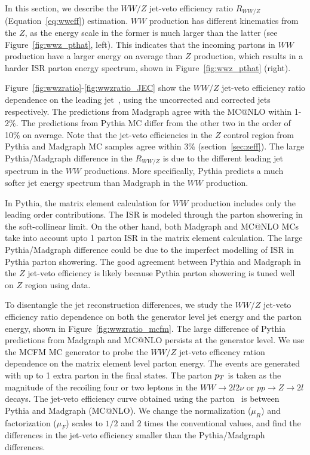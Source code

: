 In this section, we describe the $WW/Z$ jet-veto efficiency 
ratio $R_{WW/Z}$ (Equation~\ref{eq:wweff}) estimation. 
$WW$ production has different kinematics from the $Z$, as 
the energy scale in the former is much larger than the latter 
(see Figure~\ref{fig:wwz_pthat}, left).
This indicates that the incoming partons %
in $WW$ production have a larger energy on average than $Z$ production, 
which results in a harder ISR parton energy spectrum, 
shown in Figure~\ref{fig:wwz_pthat} (right). 

Figure~\ref{fig:wwzratio}-\ref{fig:wwzratio_JEC} show 
the $WW/Z$ jet-veto efficiency ratio dependence on the 
leading jet \pt\,, using the uncorrected and corrected jets respectively. 
The predictions from Madgraph agree with the MC@NLO within 1-2\%.
The predictions from Pythia MC differ from the 
other two in the order of 10\% on average. 
Note that the jet-veto efficiencies in the $Z$ control region 
from Pythia and Madgraph MC samples agree within 3\% (section~\ref{sec:zeff}). 
The large Pythia/Madgraph difference in the $R_{WW/Z}$ 
is due to the different leading jet \pt\, spectrum in the 
$WW$ productions. More specifically, Pythia predicts a much softer 
jet energy spectrum than Madgraph in the $WW$ production. 

In Pythia, the matrix element calculation for $WW$ production 
includes only the leading order contributions. 
The ISR is modeled through the parton 
showering in the soft-collinear limit. 
On the other hand, both Madgraph and MC@NLO MCs 
take into account upto 1 parton ISR in the matrix element calculation.
The large Pythia/Madgraph difference could be due to the 
imperfect modelling of ISR in Pythia parton showering. 
The good agreement between Pythia and Madgraph in the 
$Z$ jet-veto efficiency is likely because Pythia parton 
showering is tuned well on $Z$ region using data. 

To disentangle the jet reconstruction differences, we study the 
$WW/Z$ jet-veto efficiency ratio dependence on both the generator level 
jet energy and the parton energy, shown in Figure~\ref{fig:wwzratio_mcfm}. 
The large difference of Pythia predictions from Madgraph and MC@NLO 
persists at the generator level. 
We use the MCFM\cite{ref:mcfm} MC generator to probe the $WW/Z$ jet-veto 
efficency ration dependence on the matrix element level parton energy. 
The events are generated with up to 1 extra parton in the final states. 
The parton $p_T$ is taken as the magnitude of the recoiling four or two 
leptons \pt in the $WW\to 2l2\nu$ or $pp\to Z\to 2l$ decays. 
The jet-veto efficiency curve obtained using the parton \pt\, is between 
Pythia and Madgraph (MC@NLO). 
We change the normalization ($\mu_R$) and factorization ($\mu_F$) scales 
to $1/2$ and $2$ times the conventional values, and 
find the differences in the jet-veto efficiency 
smaller than the Pythia/Madgraph differences. 

